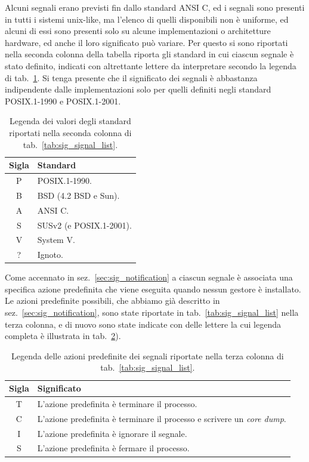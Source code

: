 Alcuni segnali erano previsti fin dallo standard ANSI C, ed i segnali sono
presenti in tutti i sistemi unix-like, ma l'elenco di quelli disponibili non è
uniforme, ed alcuni di essi sono presenti solo su alcune implementazioni o
architetture hardware, ed anche il loro significato può variare. Per questo si
sono riportati nella seconda colonna della tabella riporta gli standard in cui
ciascun segnale è stato definito, indicati con altrettante lettere da
interpretare secondo la legenda di tab.~\ref{tab:sig_standard_leg}. Si tenga
presente che il significato dei segnali è abbastanza indipendente dalle
implementazioni solo per quelli definiti negli standard POSIX.1-1990 e
POSIX.1-2001. 

\begin{table}[htb]
  \footnotesize
  \centering
  \begin{tabular}[c]{|c|l|}
    \hline
    \textbf{Sigla} & \textbf{Standard} \\
    \hline
    \hline
    P & POSIX.1-1990.\\
    B & BSD (4.2 BSD e Sun).\\
    A & ANSI C.\\
    S & SUSv2 (e POSIX.1-2001).\\
    V & System V.\\
    ? & Ignoto.\\
    \hline
  \end{tabular}
  \caption{Legenda dei valori degli standard riportati nella seconda colonna
    di tab.~\ref{tab:sig_signal_list}.} 
  \label{tab:sig_standard_leg}
\end{table}

Come accennato in sez.~\ref{sec:sig_notification} a ciascun segnale è
associata una specifica azione predefinita che viene eseguita quando nessun
gestore è installato. Le azioni predefinite possibili, che abbiamo già
descritto in sez.~\ref{sec:sig_notification}, sono state riportate in
tab.~\ref{tab:sig_signal_list} nella terza colonna, e di nuovo sono state
indicate con delle lettere la cui legenda completa è illustrata in
tab.~\ref{tab:sig_action_leg}).

\begin{table}[htb]
  \footnotesize
  \centering
  \begin{tabular}[c]{|c|l|}
    \hline
    \textbf{Sigla} & \textbf{Significato} \\
    \hline
    \hline
    T & L'azione predefinita è terminare il processo.\\
    C & L'azione predefinita è terminare il processo e scrivere un 
        \textit{core dump}.\\
    I & L'azione predefinita è ignorare il segnale.\\
    S & L'azione predefinita è fermare il processo.\\
    \hline
  \end{tabular}
  \caption{Legenda delle azioni predefinite dei segnali riportate nella terza
    colonna di tab.~\ref{tab:sig_signal_list}.}
  \label{tab:sig_action_leg}
\end{table}


